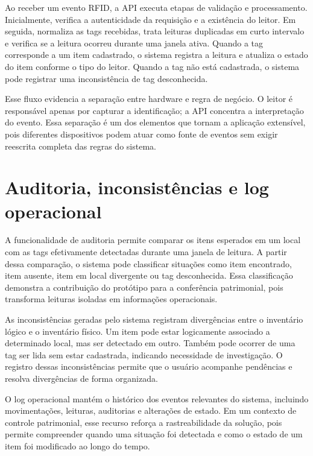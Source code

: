 

Ao receber um evento RFID, a API executa etapas de validação e processamento. Inicialmente, verifica a autenticidade da requisição e a existência do leitor. Em seguida, normaliza as tags recebidas, trata leituras duplicadas em curto intervalo e verifica se a leitura ocorreu durante uma janela ativa. Quando a tag corresponde a um item cadastrado, o sistema registra a leitura e atualiza o estado do item conforme o tipo do leitor. Quando a tag não está cadastrada, o sistema pode registrar uma inconsistência de tag desconhecida.

Esse fluxo evidencia a separação entre hardware e regra de negócio. O leitor é responsável apenas por capturar a identificação; a API concentra a interpretação do evento. Essa separação é um dos elementos que tornam a aplicação extensível, pois diferentes dispositivos podem atuar como fonte de eventos sem exigir reescrita completa das regras do sistema.

\section{Auditoria, inconsistências e log operacional}

A funcionalidade de auditoria permite comparar os itens esperados em um local com as tags efetivamente detectadas durante uma janela de leitura. A partir dessa comparação, o sistema pode classificar situações como item encontrado, item ausente, item em local divergente ou tag desconhecida. Essa classificação demonstra a contribuição do protótipo para a conferência patrimonial, pois transforma leituras isoladas em informações operacionais.

As inconsistências geradas pelo sistema registram divergências entre o inventário lógico e o inventário físico. Um item pode estar logicamente associado a determinado local, mas ser detectado em outro. Também pode ocorrer de uma tag ser lida sem estar cadastrada, indicando necessidade de investigação. O registro dessas inconsistências permite que o usuário acompanhe pendências e resolva divergências de forma organizada.

O log operacional mantém o histórico dos eventos relevantes do sistema, incluindo movimentações, leituras, auditorias e alterações de estado. Em um contexto de controle patrimonial, esse recurso reforça a rastreabilidade da solução, pois permite compreender quando uma situação foi detectada e como o estado de um item foi modificado ao longo do tempo.

